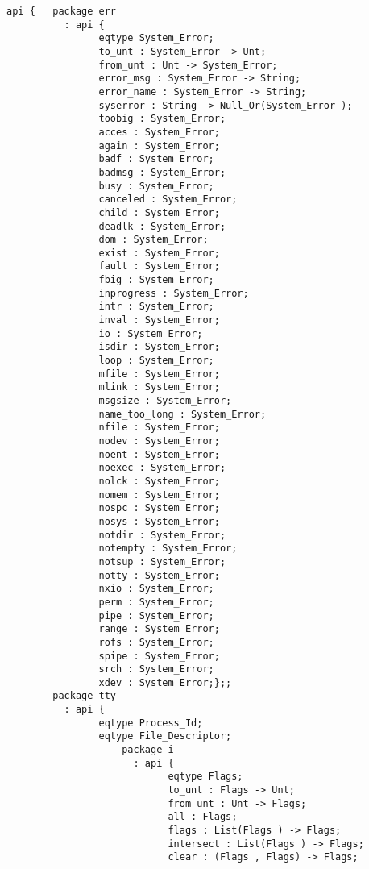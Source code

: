\label{api:Posixlib}
\begin{verbatim}
api {   package err
          : api {
                eqtype System_Error;
                to_unt : System_Error -> Unt;
                from_unt : Unt -> System_Error;
                error_msg : System_Error -> String;
                error_name : System_Error -> String;
                syserror : String -> Null_Or(System_Error );
                toobig : System_Error;
                acces : System_Error;
                again : System_Error;
                badf : System_Error;
                badmsg : System_Error;
                busy : System_Error;
                canceled : System_Error;
                child : System_Error;
                deadlk : System_Error;
                dom : System_Error;
                exist : System_Error;
                fault : System_Error;
                fbig : System_Error;
                inprogress : System_Error;
                intr : System_Error;
                inval : System_Error;
                io : System_Error;
                isdir : System_Error;
                loop : System_Error;
                mfile : System_Error;
                mlink : System_Error;
                msgsize : System_Error;
                name_too_long : System_Error;
                nfile : System_Error;
                nodev : System_Error;
                noent : System_Error;
                noexec : System_Error;
                nolck : System_Error;
                nomem : System_Error;
                nospc : System_Error;
                nosys : System_Error;
                notdir : System_Error;
                notempty : System_Error;
                notsup : System_Error;
                notty : System_Error;
                nxio : System_Error;
                perm : System_Error;
                pipe : System_Error;
                range : System_Error;
                rofs : System_Error;
                spipe : System_Error;
                srch : System_Error;
                xdev : System_Error;};;
        package tty
          : api {
                eqtype Process_Id;
                eqtype File_Descriptor;
                    package i
                      : api {
                            eqtype Flags;
                            to_unt : Flags -> Unt;
                            from_unt : Unt -> Flags;
                            all : Flags;
                            flags : List(Flags ) -> Flags;
                            intersect : List(Flags ) -> Flags;
                            clear : (Flags , Flags) -> Flags;

\end{verbatim}
